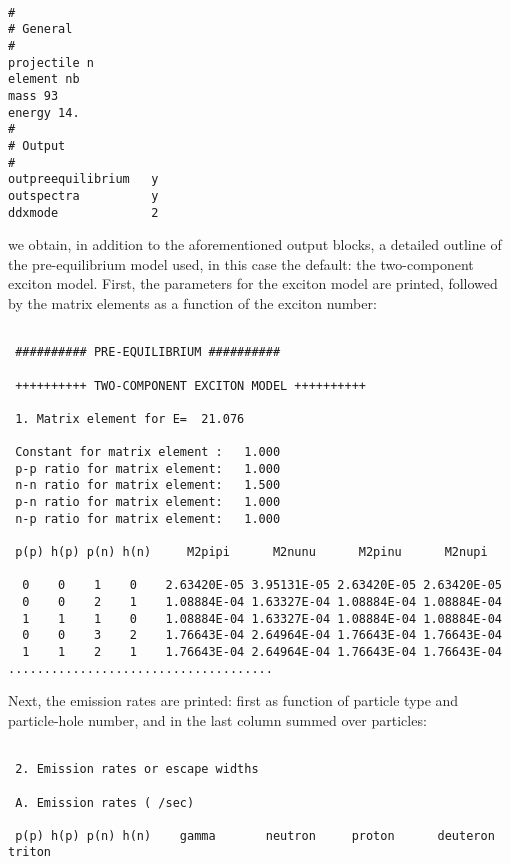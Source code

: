 \begin{samplecase}
{\small \begin{verbatim}

#
# General
#
projectile n
element nb
mass 93
energy 14.
#
# Output
#
outpreequilibrium   y
outspectra          y
ddxmode             2
\end{verbatim} } \renewcommand{\baselinestretch}{1.07}\small\normalsize
\noindent
we obtain, in addition to the aforementioned output blocks, a detailed outline
of the pre-equilibrium model used, in this case the default: the two-component 
exciton model.
First, the parameters for the exciton model are printed, followed by
the matrix elements as a function of the exciton number:

{\small \begin{verbatim}

 ########## PRE-EQUILIBRIUM ##########                      
                     
 ++++++++++ TWO-COMPONENT EXCITON MODEL ++++++++++
                               
 1. Matrix element for E=  21.076        
                                        
 Constant for matrix element :   1.000                                          
 p-p ratio for matrix element:   1.000
 n-n ratio for matrix element:   1.500                                          
 p-n ratio for matrix element:   1.000
 n-p ratio for matrix element:   1.000
 
 p(p) h(p) p(n) h(n)     M2pipi      M2nunu      M2pinu      M2nupi
 
  0    0    1    0    2.63420E-05 3.95131E-05 2.63420E-05 2.63420E-05
  0    0    2    1    1.08884E-04 1.63327E-04 1.08884E-04 1.08884E-04
  1    1    1    0    1.08884E-04 1.63327E-04 1.08884E-04 1.08884E-04
  0    0    3    2    1.76643E-04 2.64964E-04 1.76643E-04 1.76643E-04
  1    1    2    1    1.76643E-04 2.64964E-04 1.76643E-04 1.76643E-04
.....................................
\end{verbatim} } \renewcommand{\baselinestretch}{1.07}\small\normalsize
\noindent
Next, the emission 
rates are printed: first as function of particle type and particle-hole number,
and in the last column summed over particles:

{\small \begin{verbatim}

 2. Emission rates or escape widths

 A. Emission rates ( /sec)

 p(p) h(p) p(n) h(n)    gamma       neutron     proton      deuteron    triton  


\end{verbatim}}
\end{samplecase}
